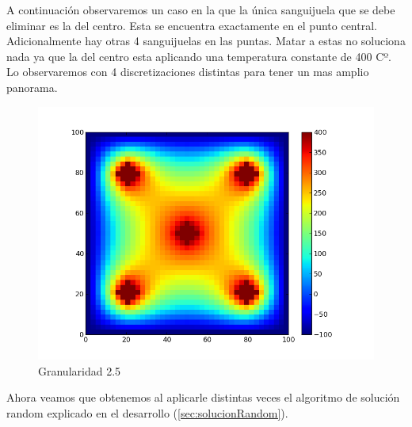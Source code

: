 A continuación observaremos un caso en la que la única sanguijuela que se debe eliminar es la del centro. Esta se encuentra exactamente en el punto central. Adicionalmente hay otras 4 sanguijuelas en las puntas. 
Matar a estas no soluciona nada ya que la del centro esta aplicando una temperatura constante de 400 Cº. Lo observaremos con 4 discretizaciones distintas para tener un mas amplio panorama.
\begin{figure}[htb]
\begin{center}
        \includegraphics[scale=0.3]{imagenes/test5.png}
                \caption{Granularidad 2.5}
        \end{center}

\end{figure}

Ahora veamos que obtenemos al aplicarle distintas veces el algoritmo de solución random explicado en el desarrollo (\ref{sec:solucionRandom}).

